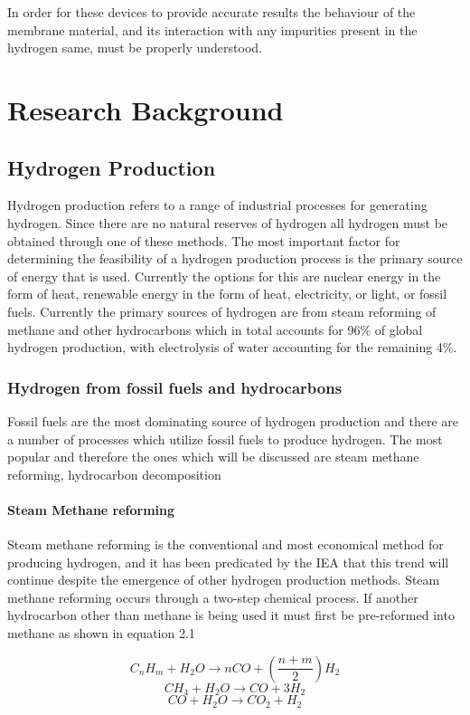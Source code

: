 In order for these devices to provide accurate results the behaviour of the membrane material, and its interaction with any impurities present in the hydrogen same, must be properly understood.  


\section{Research Background}
\subsection{Hydrogen Production}
Hydrogen production refers to a range of industrial processes for generating hydrogen. Since there are no natural reserves of hydrogen all hydrogen must be obtained through one of these methods. The most important factor for determining the feasibility of a hydrogen production process is the primary source of energy that is used. Currently the options for this are nuclear energy in the form of heat, renewable energy in the form of heat, electricity, or light, or fossil fuels. Currently the primary sources of hydrogen are from steam reforming of methane and other hydrocarbons which in total accounts for 96\% of global hydrogen production, with electrolysis of water accounting for the remaining 4\%.
\subsubsection{Hydrogen from fossil fuels and hydrocarbons}
Fossil fuels are the most dominating source of hydrogen production and there are a number of processes which utilize fossil fuels to produce hydrogen. The most popular and therefore the ones which will be discussed are steam methane reforming, hydrocarbon decomposition
\paragraph{Steam Methane reforming}
Steam methane reforming is the conventional and most economical method for producing hydrogen, and it has been predicated by the IEA that this trend will continue despite the emergence of other hydrogen production methods. Steam methane reforming occurs through a two-step chemical process. If another hydrocarbon other than methane is being used it must first be pre-reformed into methane as shown in equation 2.1

\begin{equation}
    C_n H_m + H_2 O \rightarrow nCO +(\frac{n+m}{2})H_2
\end{equation}
\begin{equation}
    CH_4 + H_2 O \rightarrow CO + 3H_2 
\end{equation}
\begin{equation}
    CO+ H_2 O \rightarrow CO_2 + H_2 
\end{equation}

